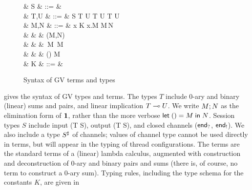 \documentclass[orivec,envcountsame]{llncs}
\begin{document}
\begin{figure}[t]
\begin{syntax}
   & S & ::= &  \mid {} \mid \interm \mid \outterm \mid {} \\
   & T,U & ::= & S \mid T \gvtimes U \mid \one \mid T \gvplus U \mid \zero \mid T \lto U \\ %
   & M,N & ::= & x \mid K \mid \lambda x.M \mid M\,N \\
  & & \mid & (M,N) \mid {} \\
  & & \mid & \,M \mid {}\,M \mid {} \\
  & & \mid & () \mid {} \mid {} \app M \\
   & K & ::= &  \mid {} \mid {} \mid {} \mid {}\\
\end{syntax}
\caption{Syntax of GV terms and types}\label{fig:gv-syntax}
\end{figure}

 gives the syntax of GV types and terms.  The types $T$ include 0-ary and binary
(linear) sums and pairs, and linear implication $T \multimap U$.  We write $M; N$ as the
elimination form of $\mathbf{1}$, rather than the more verbose $\mathsf{let}\;() = M\;\mathsf{in}\;N$.  Session types $S$
include input (\gvin T S), output (\gvout T S), and closed channels ($\mathsf{end}_?$, $\mathsf{end}_!$).  We
also include a type $S^\sharp$ of channels; values of channel type cannot be used directly in
terms, but will appear in the typing of thread configurations.  The terms are the standard terms of
a (linear) lambda calculus, augmented with construction and deconstruction of 0-ary and binary pairs
and sums (there is, of course, no term to construct a 0-ary sum).  Typing rules, including the type schema for the constants $K$, are given in
\end{document}
